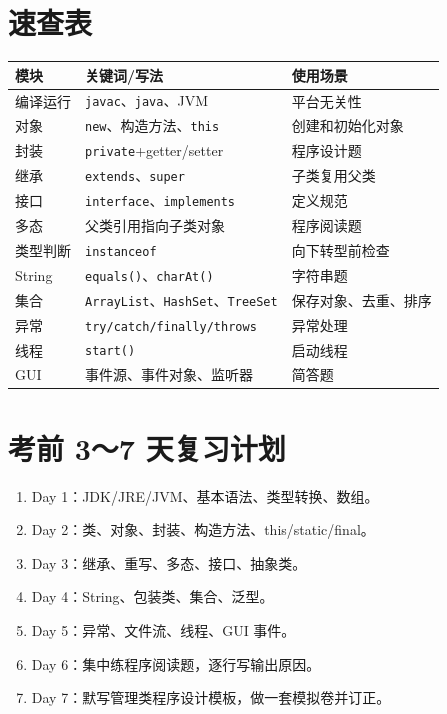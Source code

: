 \documentclass[UTF8,zihao=-4]{ctexart}
\begin{document}
\section{速查表}
\begin{longtable}{p{}p{}p{}}
\toprule
\textbf{模块} & \textbf{关键词/写法} & \textbf{使用场景} \\
\midrule
编译运行 & \texttt{javac}、\texttt{java}、JVM & 平台无关性 \\
对象 & \texttt{new}、构造方法、\texttt{this} & 创建和初始化对象 \\
封装 & \texttt{private}+getter/setter & 程序设计题 \\
继承 & \texttt{extends}、\texttt{super} & 子类复用父类 \\
接口 & \texttt{interface}、\texttt{implements} & 定义规范 \\
多态 & 父类引用指向子类对象 & 程序阅读题 \\
类型判断 & \texttt{instanceof} & 向下转型前检查 \\
String & \texttt{equals()}、\texttt{charAt()} & 字符串题 \\
集合 & \texttt{ArrayList}、\texttt{HashSet}、\texttt{TreeSet} & 保存对象、去重、排序 \\
异常 & \texttt{try/catch/finally/throws} & 异常处理 \\
线程 & \texttt{start()} & 启动线程 \\
GUI & 事件源、事件对象、监听器 & 简答题 \\
\bottomrule
\end{longtable}

\section{考前 3～7 天复习计划}
\begin{methodbox}[7 天版]
\begin{enumerate}
  \item Day 1：JDK/JRE/JVM、基本语法、类型转换、数组。
  \item Day 2：类、对象、封装、构造方法、this/static/final。
  \item Day 3：继承、重写、多态、接口、抽象类。
  \item Day 4：String、包装类、集合、泛型。
  \item Day 5：异常、文件流、线程、GUI 事件。
  \item Day 6：集中练程序阅读题，逐行写输出原因。
  \item Day 7：默写管理类程序设计模板，做一套模拟卷并订正。
\end{enumerate}
\end{methodbox}
\end{document}

